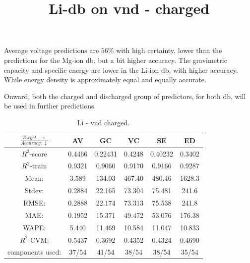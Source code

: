 Average voltage predictions are $56\%$ with high certainty, lower than the predictions for the Mg-ion db, but a bit higher accuracy. The gravimetric capacity and specific energy are lower in the Li-ion db, with higher accuracy. While energy density is approximately equal and equally accurate. 


Onward, both the charged and discharged group of predictors, for both db, will be used in further predictions. 


\begin{table}[H]
\scriptsize
\title{Li-db on vnd - charged}
\centering
\caption{Li - vnd charged.}
\begin{tabular}{|c|c|c|c|c|c|}
	\hline 
	$\frac{Target: \rightarrow}{Accuracy:\downarrow} $ & AV & GC & VC & SE & ED 
	 \\ 
	\hline
	$R^2$-score 	& 0.4466 & 0.22431 & 0.4248 	&  0.40232 &  0.3402\\ 
	\hline 
	$R^2$-train 	& 0.9321 & 0.9060 	& 0.9170 	& 0.9166 	& 0.9287 \\ 
	\hline
	Mean: 		&3.589	&134.03	&467.40	&480.46	&1628.3	\\
	\hline 
	Stdev:		&0.2884	&22.165	&73.304	&75.481	&241.6	\\
	\hline
	RMSE: 		& 0.2888 & 22.174	& 73.313 	& 75.538	 & 241.8 \\ 
	\hline 
	MAE: 		& 0.1952 & 15.371	 & 49.472	 & 53.076	 & 176.38 \\ 
	\hline
	WAPE: 		& 5.440 	&  11.469 	& 10.584  	& 11.047 	&10.833 \\
	\hline
	$R^2$ CVM: 	& 0.5437 & 0.3692 	& 0.4352  	& 0.4324 	&0.4690 \\
	\hline
	components used: & 37/54 & 41/54 & 38/54  & 38/54 &35/54 \\
	\hline
\end{tabular}
\label{tab:Li-vnd-i}
\end{table}

